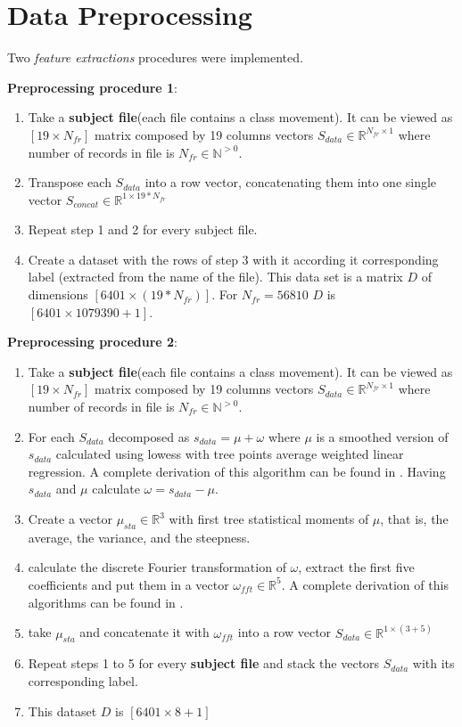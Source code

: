 \section{Data Preprocessing}

Two \textit{feature extractions} procedures were implemented.

\textbf{Preprocessing procedure 1}:
\begin{enumerate}
	\item Take a \textbf{subject file}(each file contains a class movement). It can be viewed as $[19 \times N_{fr}]$ matrix composed by 19 columns vectors $S_{data} \in \mathbb{R}^{N_{fr} \times 1}$  where number of records in file is $N_{fr} \in \mathbb{N}^{>0}$.
	\item Transpose each $S_{data}$ into a row vector, concatenating them into one single vector $S_{concat} \in  \mathbb{R}^{1 \times 19*N_{fr} }$ 
	\item Repeat step 1 and 2 for every subject file.
	\item Create a dataset with the rows of step 3 with it according it corresponding label (extracted from the name of the file). This data set is a matrix $D$ of dimensions $[6401 \times (19*N_{fr})]$. For $N_{fr}=56810$ $D$ is $[6401 \times 1079390+1]$.
\end{enumerate}

\textbf{Preprocessing procedure 2}:
\begin{enumerate}
	\item Take a \textbf{subject file}(each file contains a class movement). It can be viewed as $[19 \times N_{fr}]$ matrix composed by 19 columns vectors $S_{data} \in \mathbb{R}^{N_{fr} \times 1}$  where number of records in file is $N_{fr} \in \mathbb{N}^{>0}$.
	\item For each $S_{data}$ decomposed as $s_{data}=\mu+\omega$ where $\mu$ is a smoothed version of $s_{data}$ calculated using lowess with tree points average weighted linear regression. A complete derivation of this algorithm can be found in \cite{1}. Having $s_{data}$ and $\mu$ calculate $\omega =s_{data}-\mu$. 
	\item Create a vector $\mu_{sta} \in \mathbb{R}^{3}$ with first tree statistical moments of $\mu$, that is, the average, the variance, and the steepness. 
	\item calculate the discrete Fourier transformation of $\omega$, extract the first five coefficients and put them in a vector $\omega_{fft} \in \mathbb{R}^{5}$. A complete derivation of this algorithms can be found in \cite{2}.
	\item take $\mu_{sta}$ and concatenate it with $\omega_{fft}$ into a row vector $S_{data} \in \mathbb{R}^{1 \times (3+5) }$
	\item Repeat steps 1 to 5 for every \textbf{subject file} and stack the vectors $S_{data}$ with its corresponding label.
	\item This dataset $D$ is $[6401 \times 8+1]$
\end{enumerate}

